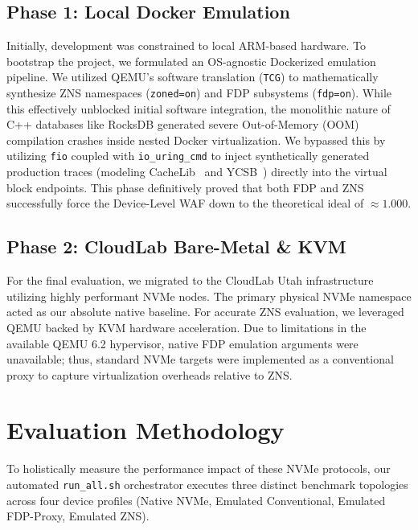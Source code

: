 \documentclass[letterpaper,twocolumn,10pt]{article}
\begin{document}
\subsection{Phase 1: Local Docker Emulation}
Initially, development was constrained to local ARM-based hardware. To bootstrap the project, we formulated an OS-agnostic Dockerized emulation pipeline. We utilized QEMU's software translation (\texttt{TCG}) to mathematically synthesize ZNS namespaces (\texttt{zoned=on}) and FDP subsystems (\texttt{fdp=on}).
While this effectively unblocked initial software integration, the monolithic nature of C++ databases like RocksDB generated severe Out-of-Memory (OOM) compilation crashes inside nested Docker virtualization. We bypassed this by utilizing \texttt{fio} coupled with \texttt{io\_uring\_cmd} to inject synthetically generated production traces (modeling CacheLib~\cite{berg2020cachelib} and YCSB~\cite{cooper2010ycsb}) directly into the virtual block endpoints. This phase definitively proved that both FDP and ZNS successfully force the Device-Level WAF down to the theoretical ideal of $\approx 1.000$.

\subsection{Phase 2: CloudLab Bare-Metal \& KVM}
For the final evaluation, we migrated to the CloudLab Utah infrastructure utilizing highly performant NVMe nodes. The primary physical NVMe namespace acted as our absolute native baseline. For accurate ZNS evaluation, we leveraged QEMU backed by KVM hardware acceleration. Due to limitations in the available QEMU 6.2 hypervisor, native FDP emulation arguments were unavailable; thus, standard NVMe targets were implemented as a conventional proxy to capture virtualization overheads relative to ZNS.

\section{Evaluation Methodology}

To holistically measure the performance impact of these NVMe protocols, our automated \texttt{run\_all.sh} orchestrator executes three distinct benchmark topologies across four device profiles (Native NVMe, Emulated Conventional, Emulated FDP-Proxy, Emulated ZNS).
\end{document}
